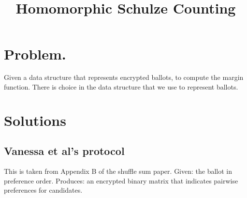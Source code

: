 \documentclass{llncs}
\title{Homomorphic Schulze Counting}
\begin{document}
\maketitle

\section{Problem.}

Given a data structure that represents encrypted ballots, to compute
the margin function. There is choice in the data structure that we
use to represent ballots.

\section{Solutions}
\subsection{Vanessa et al's protocol}

This is taken from Appendix B of the shuffle sum paper. Given: the
ballot in preference order. Produces: an encrypted binary matrix
that indicates pairwise preferences for candidates.
\end{document}
